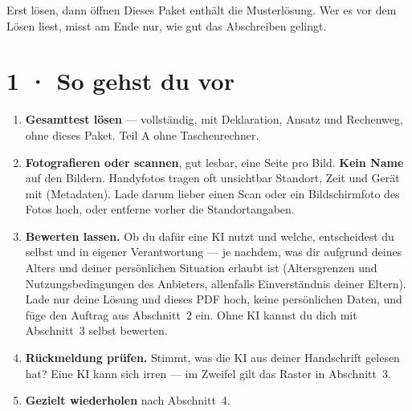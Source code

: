 \documentclass[11pt]{article}
\begin{document}

\begin{lpachtung}{Erst lösen, dann öffnen}
Dieses Paket enthält die Musterlösung. Wer es vor dem Lösen liest, misst am Ende nur, wie gut das Abschreiben gelingt.
\end{lpachtung}

\section*{1 · So gehst du vor}
\begin{enumerate}[leftmargin=*,itemsep=2pt]
\item \textbf{Gesamttest lösen} — vollständig, mit Deklaration, Ansatz und Rechenweg, ohne dieses Paket. Teil A ohne Taschenrechner.
\item \textbf{Fotografieren oder scannen}, gut lesbar, eine Seite pro Bild. \textbf{Kein Name} auf den Bildern.
  Handyfotos tragen oft unsichtbar Standort, Zeit und Gerät mit (Metadaten). Lade darum lieber einen Scan oder ein
  Bildschirmfoto des Fotos hoch, oder entferne vorher die Standortangaben.
\item \textbf{Bewerten lassen.} Ob du dafür eine KI nutzt und welche, entscheidest du selbst und in eigener Verantwortung —
  je nachdem, was dir aufgrund deines Alters und deiner persönlichen Situation erlaubt ist (Altersgrenzen und
  Nutzungsbedingungen des Anbieters, allenfalls Einverständnis deiner Eltern). Lade nur deine Lösung und dieses PDF hoch,
  keine persönlichen Daten, und füge den Auftrag aus Abschnitt~2 ein. Ohne KI kannst du dich mit Abschnitt~3 selbst bewerten.
\item \textbf{Rückmeldung prüfen.} Stimmt, was die KI aus deiner Handschrift gelesen hat? Eine KI kann sich irren —
  im Zweifel gilt das Raster in Abschnitt~3.
\item \textbf{Gezielt wiederholen} nach Abschnitt~4.
\end{enumerate}
\end{document}
